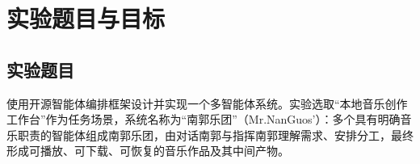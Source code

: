 \documentclass{SYSUReport}
\date{\today}
\begin{document}
\cover
{}
\thispagestyle{empty}
\clearpage

\begin{abstract}
本实验设计并实现了一个基于 LangGraph 的本地多智能体音乐创作系统“南郭乐团”（Mr.NanGuos'）。名称灵感来自“滥竽充数”的典故。智能体创作音乐本质上只是对人类艺术的拙劣模仿，所以用智能体创作音乐当然是“滥竽充数”，这些智能体自然就是“南郭先生”了，它们共同组成了一个“南郭乐团”。

系统基于 LangGraph 框架编排多智能体，把音乐创作拆分为需求理解、工作流规划、作词、旋律、和声、节奏、即兴、演奏、编曲、音色设计、混音审查和生成提示词编译等职责，再依据作品类型搭建不同的工作流图。

对外的“对话南郭”负责多轮对话、作品协调与记忆读取；“指挥南郭”依据当前请求和有效偏好选择受约束的预设路径；各专业南郭通过 Pydantic 结构化状态逐步交接生成结果；最后由供应商适配层调用 Suno 兼容服务并完成本地下载、音频分析和波形渲染。

系统实现了三种互补的推理组织方式：以指挥南郭为核心的受约束计划--执行、参考音频分析中的工具调用式推理与行动，以及生成前由审听南郭（如果用户上传了演示音频）完成的反思审查。

记忆模块同时提供会话内短期记忆和跨会话长期记忆，依据“显式创作参数、当前请求、长期偏好、系统默认”的优先级开展创作。

工具调用模块则使用了自己编写的小工具，包括音频探测与变换、波形可视化、轻量演示音频合成、MusicXML 与 MIDI 导出和外部音乐生成等多类能力。

实验结果表明，系统能够在流行人声、古典器乐、电子器乐和影视配乐等场景下选择合适路径，完成人机对话、后台生成、进度反馈、作品归档与偏好管理。

\textbf{关键词：}多智能体系统；智能体编排；音乐生成；结构化状态；长期记忆；工具调用
\end{abstract}

\clearpage
\tableofcontents
\clearpage
{}
\setcounter{page}{1}

\section{实验题目与目标}

\subsection{实验题目}

使用开源智能体编排框架设计并实现一个多智能体系统。实验选取“本地音乐创作工作台”作为任务场景，系统名称为“南郭乐团”（Mr.NanGuos'）：多个具有明确音乐职责的智能体组成南郭乐团，由对话南郭与指挥南郭理解需求、安排分工，最终形成可播放、可下载、可恢复的音乐作品及其中间产物。
\end{document}
